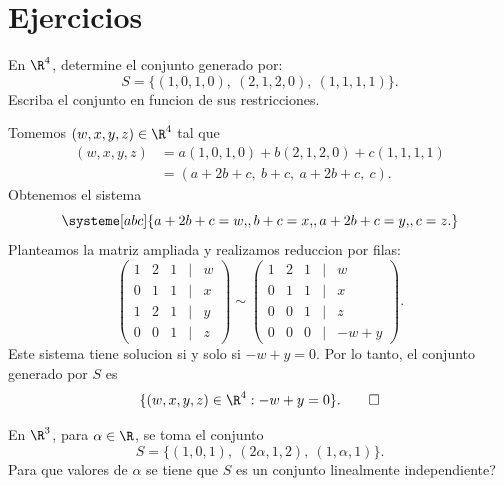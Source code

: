 \documentclass[11pt,respuestas,a4]{aleph-examen}
\begin{document}
\encabezado

\section*{Ejercicios}

\begin{preguntas}

\item
    En $\R^4$, determine el conjunto generado por:
    \[
        S = \big\{
            (1,0,1,0),\
            (2,1,2,0),\
            (1,1,1,1)\big\}.
    \]
    Escriba el conjunto en funcion de sus restricciones.

\begin{respuesta}
    Tomemos $(w,x,y,z)\in\R^4$ tal que
    \begin{align*}
        (w,x,y,z)
        & = a(1,0,1,0) + b(2,1,2,0) + c(1,1,1,1)\\
        & = (a+2b+c,\ b+c,\ a+2b+c,\ c).
    \end{align*}
    Obtenemos el sistema
    \[
        \systeme[abc]{
            a+2b+c = w{,},
            b+c = x{,},
            a+2b+c = y{,},
            c = z{.}
        }
    \]
    Planteamos la matriz ampliada y realizamos reduccion por filas:
    \[
        \begin{pmatrix}
            1 & 2 & 1 & | & w\\
            0 & 1 & 1 & | & x\\
            1 & 2 & 1 & | & y\\
            0 & 0 & 1 & | & z
        \end{pmatrix}
        \sim
        \begin{pmatrix}
            1 & 2 & 1 & | & w\\
            0 & 1 & 1 & | & x\\
            0 & 0 & 1 & | & z\\
            0 & 0 & 0 & | & - w + y
        \end{pmatrix}.
    \]
    Este sistema tiene solucion si y solo si $-w + y = 0$. Por lo tanto, el conjunto generado por $S$ es
    \[
        \{
            (w,x,y,z)\in\R^4 : -w + y = 0
        \}.\qedhere
    \]
\end{respuesta}

\item
    En $\R^3$, para $\alpha \in \R$, se toma el conjunto
    \[
        S = \big\{
            (1,0,1),\
            (2\alpha,1,2),\
            (1,\alpha,1)\big\}.
    \]
    Para que valores de $\alpha$ se tiene que $S$ es un conjunto linealmente independiente?


\end{preguntas}
\end{document}
